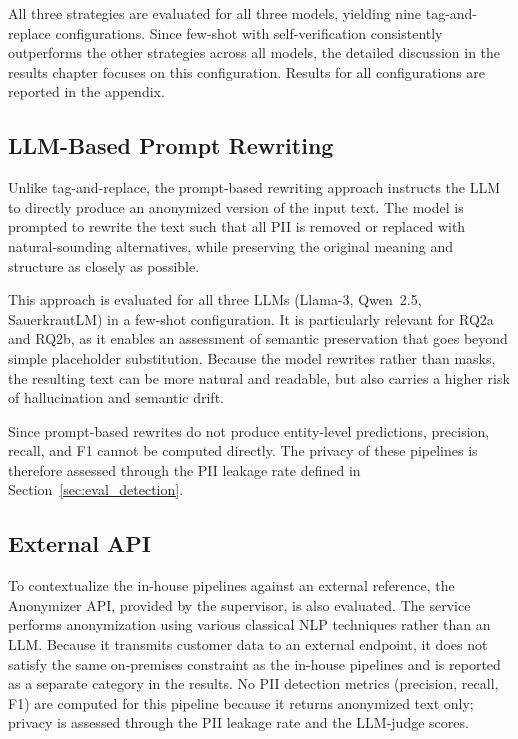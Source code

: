 All three strategies are evaluated for all three models, yielding nine
tag-and-replace configurations. Since few-shot with self-verification
consistently outperforms the other strategies across all models, the detailed
discussion in the results chapter focuses on this configuration. Results for
all configurations are reported in the appendix.


\subsection{LLM-Based Prompt Rewriting}
\label{sec:llm_prompt_rewrite}

Unlike tag-and-replace, the prompt-based rewriting approach instructs the LLM to
directly produce an anonymized version of the input text. The model is prompted
to rewrite the text such that all PII is removed or replaced with
natural-sounding alternatives, while preserving the original meaning and
structure as closely as possible.

This approach is evaluated for all three LLMs (Llama-3, Qwen~2.5, SauerkrautLM)
in a few-shot configuration. It is particularly relevant for RQ2a and RQ2b,
as it enables an assessment of semantic preservation that goes beyond simple
placeholder substitution. Because the model rewrites rather than masks, the
resulting text can be more natural and readable, but also carries a higher risk
of hallucination and semantic drift.

Since prompt-based rewrites do not produce entity-level predictions,
precision, recall, and F1 cannot be computed directly. The privacy of
these pipelines is therefore assessed through the PII leakage rate
defined in Section~\ref{sec:eval_detection}.


\subsection{External API}
\label{sec:external_api}

To contextualize the in-house pipelines against an external reference,
the Anonymizer API, provided by the supervisor, is also evaluated. The
service performs anonymization using various classical NLP techniques
rather than an LLM. Because it transmits customer data to an external
endpoint, it does not satisfy the same on-premises constraint as the
in-house pipelines and is reported as a separate category in the
results. No PII detection metrics (precision, recall, F1) are computed
for this pipeline because it returns anonymized text only; privacy is
assessed through the PII leakage rate and the LLM-judge scores.


